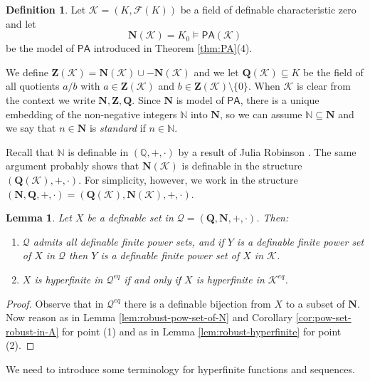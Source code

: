 \documentclass{amsart}
\newcommand{\N}{\mathbb N}
\newcommand{\Q}{\mathbb Q}
\newcommand{\ca}{\mathcal}
\theoremstyle{plain}
\newtheorem{lem}[thm]{Lemma}
\theoremstyle{definition}
\newtheorem{defn}[thm]{Definition}
\newcommand{\F}{\mathcal{F}}
\newcommand{\PA}{\mathsf{PA}}
\newcommand{\hn}{\mathbf N}
\newcommand{\hZ}{\mathbf Z}
\newcommand{\hQ}{\mathbf Q}
\begin{document}
\begin{defn} \label{defn:NZQ} Let $\ca K = (K, \F(K))$ be a field of definable characteristic zero and let $$\hn(\ca K) = K_0 \models \PA(\ca K)$$ be the model of $\PA$ introduced in Theorem \ref{thm:PA}(4). 

We define  $\hZ (\ca K) = \hn (\ca K) \cup -\hn (\ca K)$ and we let $\hQ (\ca K) \subseteq K$ be the field of all quotients $a/b$ with $a\in \hZ(\ca K)$ and $b\in \hZ (\ca K) \setminus \{0\}$. 
When $\ca K$ is clear from the context we write $\hn, \hZ, \hQ$. 
Since $\hn$ is model of $\PA$, there is a unique embedding of the non-negative integers $\N$ into $\hn$, so we can assume $\N\subseteq \hn$ and we say that $n\in \hn$ is \emph{standard} if $n\in \N$. 
\end{defn} 

Recall that $\N$ is definable in $(\Q,+,\cdot)$ by a result of Julia Robinson \cite[Theorem 3.1]{Robinson}. The same argument probably shows that $\hn(\ca K)$ is definable in the structure $(\hQ (\ca K),+,\cdot)$. For simplicity, however, we work in the structure $(\hn, \hQ, +, \cdot) = (\hQ (\ca K),\hn (\ca K),+,\cdot)$.

\begin{lem}\label{lem:robust-hyperfinite-in-Q}
    Let $X$ be a definable set in $\ca Q = (\hQ, \hn, +, \cdot)$. Then: 
    \begin{enumerate}
        \item  $\ca Q$ admits all definable finite power sets, and if $Y$ is a definable finite power set of $X$ in $\ca Q$ then $Y$ is a definable finite power set of $X$ in $\ca K$. 
   \item $X$ is hyperfinite in $\ca Q^{eq}$ if and only if $X$ is hyperfinite in $\ca K^{eq}$. 
    \end{enumerate}
\end{lem}


\begin{proof}
    Observe that in $\ca Q^{eq}$ there is a definable bijection from $X$ to a subset of $\hn$. Now reason as in Lemma \ref{lem:robust-pow-set-of-N} and Corollary \ref{cor:pow-set-robust-in-A} for point (1) and as in Lemma \ref{lem:robust-hyperfinite} for point (2). 
\end{proof}



We need to introduce some terminology for hyperfinite functions and sequences. 
\end{document}
